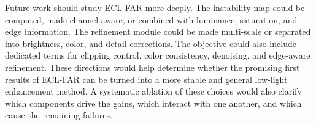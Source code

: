 Future work should study ECL-FAR more deeply. The instability map could be computed, made channel-aware, or combined with luminance, saturation, and edge information. The refinement module could be made multi-scale or separated into brightness, color, and detail corrections. The objective could also include dedicated terms for clipping control, color consistency, denoising, and edge-aware refinement. These directions would help determine whether the promising first results of ECL-FAR can be turned into a more stable and general low-light enhancement method. A systematic ablation of these choices would also clarify which components drive the gains, which interact with one another, and which cause the remaining failures.